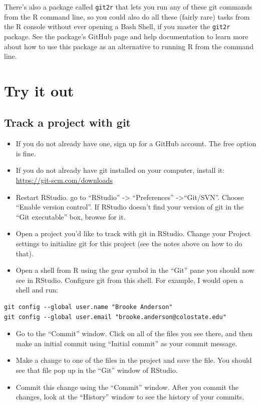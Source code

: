 \documentclass[]{tufte-book}
\providecommand{\tightlist}{%
  \setlength{\itemsep}{0pt}\setlength{\parskip}{0pt}}
\begin{document}
There's also a package called \texttt{git2r} that lets you run any of these git
commands from the R command line, so you could also do all these (fairly rare)
tasks from the R console without ever opening a Bash Shell, if you master the
\texttt{git2r} package. See the package's GitHub page and help documentation
to learn more about how to use this package as an alternative to running R from
the command line.

\hypertarget{try-it-out}{%
\section{Try it out}\label{try-it-out}}

\hypertarget{track-a-project-with-git}{%
\subsection{Track a project with git}\label{track-a-project-with-git}}

\begin{itemize}
\tightlist
\item
  If you do not already have one, sign up for a GitHub account. The free option
  is fine.
\item
  If you do not already have git installed on your computer, install it:
  \url{https://git-scm.com/downloads}
\item
  Restart RStudio. go to ``RStudio'' -\textgreater{} ``Preferences'' -\textgreater{}``Git/SVN''. Choose ``Enable
  version control''. If RStudio doesn't find your version of git in the ``Git
  executable'' box, browse for it.
\item
  Open a project you'd like to track with git in RStudio. Change your Project
  settings to initialize git for this project (see the notes above on how to do
  that).
\item
  Open a shell from R using the gear symbol in the ``Git'' pane you should now see
  in RStudio. Configure git from this shell. For example, I would open a shell and run:
\end{itemize}

\begin{verbatim}
git config --global user.name "Brooke Anderson"
git config --global user.email "brooke.anderson@colostate.edu"
\end{verbatim}

\begin{itemize}
\tightlist
\item
  Go to the ``Commit'' window. Click on all of the files you see there, and then
  make an initial commit using ``Initial commit'' as your commit message.
\item
  Make a change to one of the files in the project and save the file. You should
  see that file pop up in the ``Git'' window of RStudio.
\item
  Commit this change using the ``Commit'' window. After you commit the changes,
  look at the ``History'' window to see the history of your commits.
\end{itemize}
\end{document}
